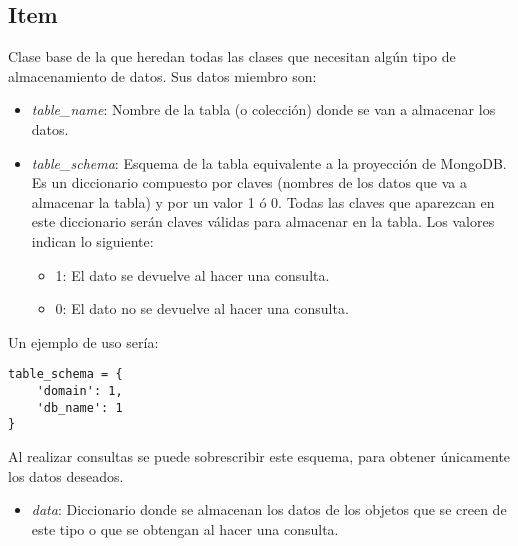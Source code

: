 \subsection{Item}

Clase base de la que heredan todas las clases que necesitan algún tipo de almacenamiento de datos. Sus datos miembro son:
\begin{itemize}
	\item \textit{table\_name}: Nombre de la tabla (o colección) donde se van a almacenar los datos.
	\item \textit{table\_schema}: Esquema de la tabla equivalente a la proyección de MongoDB. Es un diccionario compuesto por claves (nombres de los datos que va a almacenar la tabla) y por un valor 1 ó 0. Todas las claves que aparezcan en este diccionario serán claves válidas para almacenar en la tabla. Los valores indican lo siguiente:
	\begin{itemize}
		\item 1: El dato se devuelve al hacer una consulta.
		\item 0: El dato no se devuelve al hacer una consulta.
	\end{itemize}
\end{itemize}

\bigskip
Un ejemplo de uso sería:

\begin{lstlisting}
table_schema = {
	'domain': 1,
	'db_name': 1
}
\end{lstlisting}

\bigskip
Al realizar consultas se puede sobrescribir este esquema, para obtener únicamente los datos deseados.
\begin{itemize}
	\item \textit{data}: Diccionario donde se almacenan los datos de los objetos que se creen de este tipo o que se obtengan al hacer una consulta.
\end{itemize}


